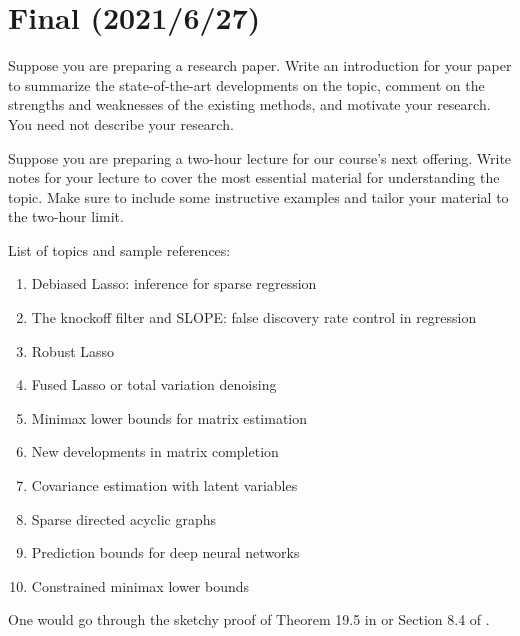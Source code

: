 \documentclass[12pt, a3paper, openany]{book}
\begin{document}
\clearpage

\section*{\bf Final \sf\scriptsize (2021/6/27)}
\setcounter{Prob}{0}
\begin{Prob}
Suppose you are preparing a research paper. Write an introduction for your paper to summarize the state-of-the-art developments on the topic, comment on the strengths and weaknesses of the existing methods, and motivate your research. You need not describe your research.
\end{Prob}
\begin{Prob}
Suppose you are preparing a two-hour lecture for our course's next offering. Write notes for your lecture to cover the most essential material for understanding the topic. Make sure to include some instructive examples and tailor your material to the two-hour limit.
\end{Prob}

{\large List of topics and sample references:}
\begin{enumerate}
\item Debiased Lasso: inference for sparse regression
\item The knockoff filter and SLOPE: false discovery rate control in regression 
\item Robust Lasso
\item Fused Lasso or total variation denoising
\item Minimax lower bounds for matrix estimation
\item New developments in matrix completion
\item Covariance estimation with latent variables
\item Sparse directed acyclic graphs
\item Prediction bounds for deep neural networks
\item Constrained minimax lower bounds
\end{enumerate}
One would go through the sketchy proof of Theorem 19.5 in \cite{vdVaart1998asymptotic} or Section 8.4 of \cite{Kosorok2008Introduction}.
\end{document}
